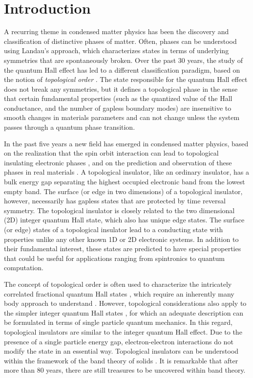 \documentclass[twocolumn,floatfix,showpacs,rmp,aps]{revtex4}
\begin{document}
	\section{Introduction}
	\label{sec:intro}
	
	A recurring theme in condensed matter physics
	has been the discovery and classification of distinctive phases of matter.
	Often, phases can be understood using Landau's approach, which characterizes
	states in terms of underlying symmetries that are spontaneously
	broken.   Over the past 30 years, the study
	of the quantum Hall effect has led to a different classification paradigm, based
	on the notion of {\it topological order} \cite{thouless82,wen95}.  The
	state responsible for the quantum Hall effect does not
	break any symmetries, but it defines a topological phase in the
	sense that certain fundamental properties (such as the quantized value of the
	Hall conductance, and the number of gapless boundary modes)
	are insensitive to smooth changes in materials
	parameters and can not change unless the system passes
	through a quantum phase transition.
	
	In the past five years a new field has emerged in condensed matter
	physics, based on the realization that the spin orbit interaction can
	lead to topological insulating electronic phases
	\cite{kanemele05a,kanemele05b,moorebalents07,fukanemele07,roy09b}, and on the prediction
	and observation of these phases in real materials
	\cite{bernevighugheszhang06,fukane07,konig07,hsieh08,xia09a,zhangh09}.  A
	topological insulator, like an ordinary insulator, has a bulk energy
	gap separating the highest occupied electronic band from the lowest
	empty band. The surface (or edge in two dimensions) of a topological
	insulator, however, necessarily has gapless states that are
	protected by time reversal symmetry.  The
	topological insulator is closely related to the two dimensional (2D)
	integer quantum Hall state, which also has unique
	edge states.   The surface (or edge) states of a topological insulator lead
	to a conducting state with properties unlike any other known
	1D or 2D electronic systems.  In addition to their
	fundamental interest, these states are predicted to have special
	properties that could be useful for applications ranging from
	spintronics to quantum computation.
	
	The concept of topological order \cite{wen95} is often used to characterize the
	intricately correlated fractional quantum Hall states \cite{tsui82}, which require an
	inherently many body approach to understand \cite{laughlin83}.  However,
	topological considerations also apply to the simpler
	integer quantum Hall states \cite{thouless82}, for
	which an adequate description can be formulated in terms of single
	particle quantum mechanics.  In this regard, topological insulators
	are similar to the integer quantum Hall effect.  Due to the presence of a
	single particle energy gap, electron-electron
	interactions do not modify the state in an essential way.
	Topological insulators can be understood within the framework of the band
	theory of solids \cite{bloch29}.  It is remarkable that after more than 80 years,
	there are still treasures to be uncovered within band theory.
	
\end{document}
